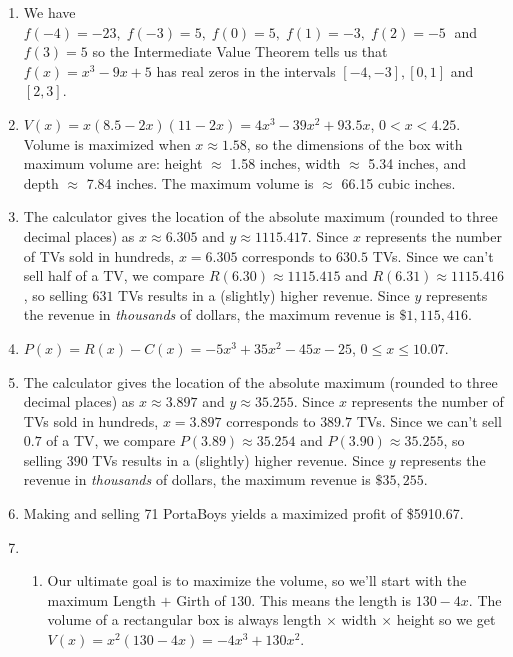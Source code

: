 \begin{enumerate}
\setcounter{enumi}{\value{HW}}

\item We have $f(-4)=-23,\; f(-3)=5,\; f(0)=5,\; f(1)=-3,\; f(2)=-5\;$ and $f(3)=5$ so the Intermediate Value Theorem tells us that $f(x) = x^{3} - 9x + 5$ has real zeros in the intervals $[-4, -3], [0, 1]$ and $[2, 3]$.

\item  $V(x) = x(8.5-2x)(11-2x) = 4x^3-39x^2+93.5x$, $0 < x < 4.25$.  Volume is maximized when $x \approx 1.58$, so the dimensions of the box with maximum volume are: height $\approx$ 1.58 inches, width $\approx$ 5.34 inches, and depth $\approx$ 7.84 inches.  The maximum volume is $\approx$ 66.15 cubic inches.


\item The calculator gives the location  of the absolute maximum (rounded to three decimal places) as $x \approx 6.305$ and $y \approx 1115.417$.  Since $x$ represents the number of TVs sold in hundreds, $x = 6.305$ corresponds to $630.5$ TVs.  Since we can't sell half of a TV, we compare $R(6.30) \approx 1115.415$ and $R(6.31) \approx 1115.416$, so selling $631$ TVs results in a (slightly) higher revenue.  Since $y$ represents the revenue in \textit{thousands} of dollars, the maximum revenue is $\$ 1,\!115,\!416$.

\item $P(x) = R(x) - C(x) = -5x^3+35x^2-45x-25$, $0 \leq x \leq 10.07$.

\item  The calculator gives the location  of the absolute maximum (rounded to three decimal places) as $x \approx 3.897$ and $y \approx 35.255$.  Since $x$ represents the number of TVs sold in hundreds, $x = 3.897$ corresponds to $389.7$ TVs.  Since we can't sell $0.7$ of a TV, we compare $P(3.89) \approx 35.254$ and $P(3.90) \approx 35.255$, so selling $390$ TVs results in a (slightly) higher revenue.  Since $y$ represents the revenue in \textit{thousands} of dollars, the maximum revenue is $\$ 35,\!255$.

\item Making and selling 71 PortaBoys yields a maximized profit of \$5910.67.


\item \begin{enumerate}

\item Our ultimate goal is to maximize the volume, so we'll start with the maximum Length $+$ Girth of $130.$  This means the length is $130 - 4x$.  The volume of a rectangular box is always length $\times$ width $\times$ height so we get $V(x) = x^{2}(130 - 4x) = -4x^{3} + 130x^{2}$.  


\end{enumerate}
\end{enumerate}
